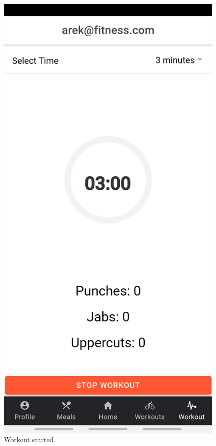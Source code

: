 \documentclass[a4paper,12pt]{report}
\begin{document}
\begin{figure}[ht] 
  \begin{minipage}[b]{0.5\linewidth}
    \centering
    \includegraphics[width=.7\linewidth]{images/aplicationImages/startWorkout.jpeg} 
    \caption{Workout started.} 
    \vspace{4ex}
  \end{minipage}%
  \begin{minipage}[b]{0.5\linewidth}
    \centering

\end{minipage}
\end{figure}
\end{document}

